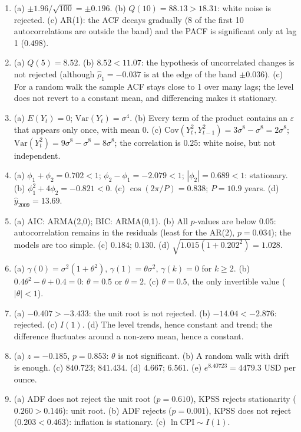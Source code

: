 \documentclass[10.5pt]{article}
\begin{document}
{\small
\begin{enumerate}[label=\textbf{\arabic*.},leftmargin=2.2em,itemsep=0.25ex]
\item (a) $\pm 1.96/\sqrt{100}=\pm 0.196$. (b) $Q(10)=88.13>18.31$: white noise is rejected. (c) AR(1): the ACF decays
gradually (8 of the first 10 autocorrelations are outside the band) and the PACF is significant only at lag 1
($0.498$).
\item (a) $Q(5)=8.52$. (b) $8.52<11.07$: the hypothesis of uncorrelated changes is not rejected (although
$\hat\rho_1=-0.037$ is at the edge of the band $\pm 0.036$). (c) For a random walk the sample ACF stays close to 1 over
many lags; the level does not revert to a constant mean, and differencing makes it stationary.
\item (a) $E(Y_t)=0$; $\mathrm{Var}(Y_t)=\sigma^4$. (b) Every term of the product contains an $\varepsilon$ that appears
only once, with mean 0. (c) $\mathrm{Cov}(Y_t^2,Y_{t-1}^2)=3\sigma^8-\sigma^8=2\sigma^8$;
$\mathrm{Var}(Y_t^2)=9\sigma^8-\sigma^8=8\sigma^8$; the correlation is $0.25$: white noise, but not independent.
\item (a) $\phi_1+\phi_2=0.702<1$; $\phi_2-\phi_1=-2.079<1$; $|\phi_2|=0.689<1$: stationary.
(b) $\phi_1^2+4\phi_2=-0.821<0$. (c) $\cos(2\pi/P)=0.838$; $P=10.9$ years. (d) $\hat y_{2009}=13.69$.
\item (a) AIC: ARMA(2,0); BIC: ARMA(0,1). (b) All $p$-values are below $0.05$: autocorrelation remains in the residuals
(least for the AR(2), $p=0.034$); the models are too simple. (c) $0.184$; $0.130$. (d)
$\sqrt{1.015(1+0.202^2)}=1.028$.
\item (a) $\gamma(0)=\sigma^2(1+\theta^2)$, $\gamma(1)=\theta\sigma^2$, $\gamma(k)=0$ for $k\ge 2$.
(b) $0.4\theta^2-\theta+0.4=0$: $\theta=0.5$ or $\theta=2$. (c) $\theta=0.5$, the only invertible value ($|\theta|<1$).
\item (a) $-0.407>-3.433$: the unit root is not rejected. (b) $-14.04<-2.876$: rejected. (c) $I(1)$.
(d) The level trends, hence constant and trend; the difference fluctuates around a non-zero mean, hence a constant.
\item (a) $z=-0.185$, $p=0.853$: $\theta$ is not significant. (b) A random walk with drift is enough. (c) $840.723$; $841.434$. (d) $4.667$; $6.561$. (e) $e^{8.40723}=4479.3$ USD per ounce.
\item (a) ADF does not reject the unit root ($p=0.610$), KPSS rejects stationarity ($0.260>0.146$): unit root.
(b) ADF rejects ($p=0.001$), KPSS does not reject ($0.203<0.463$): inflation is stationary. (c) $\ln\mathrm{CPI}\sim I(1)$.

\end{enumerate}}
\end{document}
